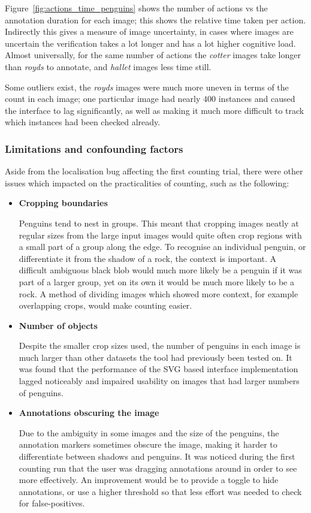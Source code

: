 Figure~\ref{fig:actions_time_penguins} shows the number of actions vs the annotation duration for each image; this shows the relative time taken per action. Indirectly this gives a measure of image uncertainty, in cases where images are uncertain the verification takes a lot longer and has a lot higher cognitive load. Almost universally, for the same number of actions the \emph{cotter} images take longer than \emph{royds} to annotate, and \emph{hallet} images less time still. 

Some outliers exist, the \emph{royds} images were much more uneven in terms of the count in each image; one particular image had nearly $400$ instances and caused the interface to lag significantly, as well as making it much more difficult to track which instances had been checked already.

\subsubsection{Limitations and confounding factors}

Aside from the localisation bug affecting the first counting trial, there were other issues which impacted on the practicalities of  counting, such as the following:
\begin{itemize}
    \item {\textbf{Cropping boundaries}}\par
Penguins tend to nest in groups. This meant that cropping images neatly at regular sizes from the large input images would quite often crop regions with a small part of a group along the edge. To recognise an individual penguin, or differentiate it from the shadow of a rock, the context is important. A difficult ambiguous black blob would much more likely be a penguin if it was part of a larger group, yet on its own it would be much more likely to be a rock. A method of dividing images which showed more context, for example overlapping crops, would make counting easier.
    \item {\textbf{Number of objects}}\par
Despite the smaller crop sizes used, the number of penguins in each image is much larger than other datasets the tool had previously been tested on. It was found that the performance of the \gls{SVG} based interface implementation lagged noticeably and impaired usability on images that had larger numbers of penguins. 
    \item {\textbf{Annotations obscuring the image}}\par
Due to the ambiguity in some images and the size of the penguins,  the annotation markers sometimes obscure the image, making it harder to differentiate between shadows and penguins. It was noticed during the first counting run that the user was dragging annotations around in order to see more effectively. An improvement would be to provide a toggle to hide annotations, or use a higher threshold so that less effort was needed to check for false-positives.

\end{itemize}



